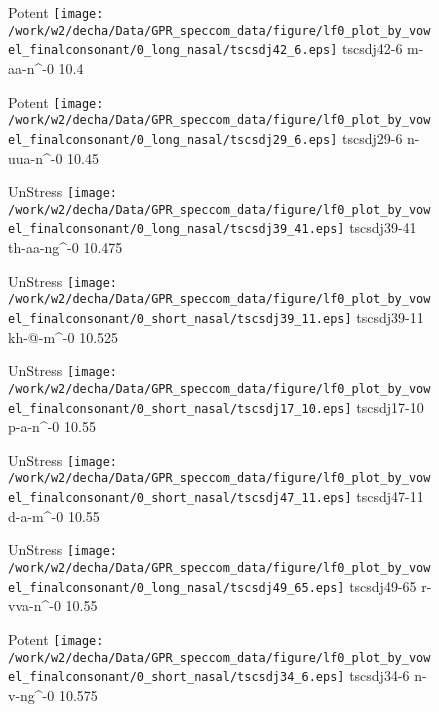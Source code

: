 \documentclass{article}
\begin{document}
\begin{figure}[t]
\begin{minipage}[b]{.24\textwidth}
\colorbox{Apricot}{Potent}
\centering
\texttt{[image: /work/w2/decha/Data/GPR\_speccom\_data/figure/lf0\_plot\_by\_vowel\_finalconsonant/0\_long\_nasal/tscsdj42\_6.eps]}
tscsdj42-6 m-aa-n\textasciicircum-0 10.4
\end{minipage}
\begin{minipage}[b]{.24\textwidth}
\colorbox{Apricot}{Potent}
\centering
\texttt{[image: /work/w2/decha/Data/GPR\_speccom\_data/figure/lf0\_plot\_by\_vowel\_finalconsonant/0\_long\_nasal/tscsdj29\_6.eps]}
tscsdj29-6 n-uua-n\textasciicircum-0 10.45
\end{minipage}
\begin{minipage}[b]{.24\textwidth}
UnStress
\centering
\texttt{[image: /work/w2/decha/Data/GPR\_speccom\_data/figure/lf0\_plot\_by\_vowel\_finalconsonant/0\_long\_nasal/tscsdj39\_41.eps]}
tscsdj39-41 th-aa-ng\textasciicircum-0 10.475
\end{minipage}
\begin{minipage}[b]{.24\textwidth}
UnStress
\centering
\texttt{[image: /work/w2/decha/Data/GPR\_speccom\_data/figure/lf0\_plot\_by\_vowel\_finalconsonant/0\_short\_nasal/tscsdj39\_11.eps]}
tscsdj39-11 kh-@-m\textasciicircum-0 10.525
\end{minipage}
\end{figure}
\clearpage
\begin{figure}[t]
\begin{minipage}[b]{.24\textwidth}
UnStress
\centering
\texttt{[image: /work/w2/decha/Data/GPR\_speccom\_data/figure/lf0\_plot\_by\_vowel\_finalconsonant/0\_short\_nasal/tscsdj17\_10.eps]}
tscsdj17-10 p-a-n\textasciicircum-0 10.55
\end{minipage}
\begin{minipage}[b]{.24\textwidth}
UnStress
\centering
\texttt{[image: /work/w2/decha/Data/GPR\_speccom\_data/figure/lf0\_plot\_by\_vowel\_finalconsonant/0\_short\_nasal/tscsdj47\_11.eps]}
tscsdj47-11 d-a-m\textasciicircum-0 10.55
\end{minipage}
\begin{minipage}[b]{.24\textwidth}
UnStress
\centering
\texttt{[image: /work/w2/decha/Data/GPR\_speccom\_data/figure/lf0\_plot\_by\_vowel\_finalconsonant/0\_long\_nasal/tscsdj49\_65.eps]}
tscsdj49-65 r-vva-n\textasciicircum-0 10.55
\end{minipage}
\begin{minipage}[b]{.24\textwidth}
\colorbox{Apricot}{Potent}
\centering
\texttt{[image: /work/w2/decha/Data/GPR\_speccom\_data/figure/lf0\_plot\_by\_vowel\_finalconsonant/0\_short\_nasal/tscsdj34\_6.eps]}
tscsdj34-6 n-v-ng\textasciicircum-0 10.575
\end{minipage}
\end{figure}
\end{document}
